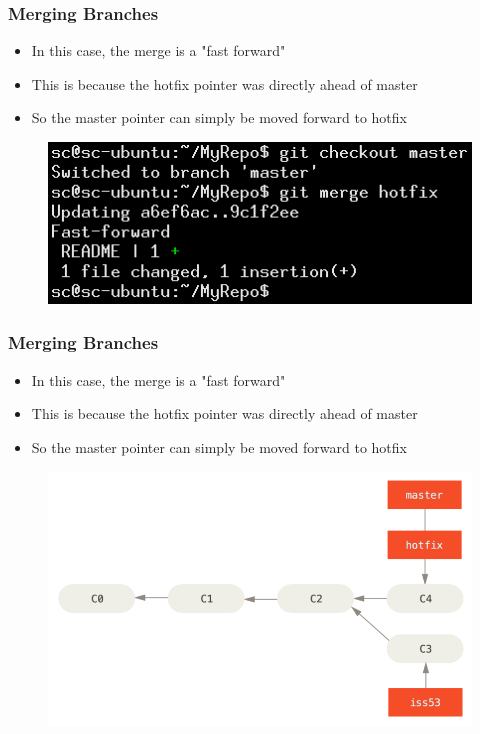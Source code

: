\documentclass{beamer}
\begin{document}
\begin{frame}
	\frametitle{Merging Branches}
	\begin{itemize}
		\item{In this case, the merge is a "fast forward"}
		\item{This is because the hotfix pointer was directly ahead of master}
		\item{So the master pointer can simply be moved forward to hotfix}
	\end{itemize}
	\begin{figure}
		\includegraphics[scale=0.5]{Merging_Branches-3.png}
	\end{figure}
\end{frame}

\begin{frame}
	\frametitle{Merging Branches}
	\begin{itemize}
		\item{In this case, the merge is a "fast forward"}
		\item{This is because the hotfix pointer was directly ahead of master}
		\item{So the master pointer can simply be moved forward to hotfix}
	\end{itemize}
	\begin{figure}
		\includegraphics[scale=0.35]{Merging_Branches-4.png}
	\end{figure}
\end{frame}
\end{document}
